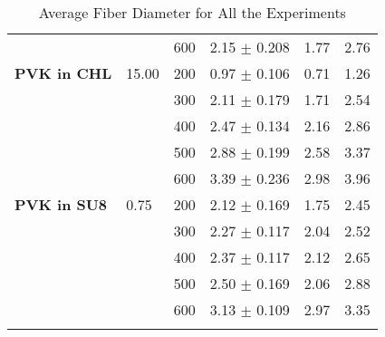{\begin{longtable}{p{} p{} p{} p{} p{} p{}}
{}                          & {}    & 600 & 2.15 $\pm$ 0.208 & 1.77 & 2.76 \\
\textbf{PVK in CHL}         & 15.00 & 200 & 0.97 $\pm$ 0.106 & 0.71 & 1.26 \\
{}                          & {}    & 300 & 2.11 $\pm$ 0.179 & 1.71 & 2.54 \\
{}                          & {}    & 400 & 2.47 $\pm$ 0.134 & 2.16 & 2.86 \\
{}                          & {}    & 500 & 2.88 $\pm$ 0.199 & 2.58 & 3.37 \\
{}                          & {}    & 600 & 3.39 $\pm$ 0.236 & 2.98 & 3.96 \\
\textbf{PVK in SU8}         & 0.75  & 200 & 2.12 $\pm$ 0.169 & 1.75 & 2.45 \\
{}                          & {}    & 300 & 2.27 $\pm$ 0.117 & 2.04 & 2.52 \\
{}                          & {}    & 400 & 2.37 $\pm$ 0.117 & 2.12 & 2.65 \\
{}                          & {}    & 500 & 2.50 $\pm$ 0.169 & 2.06 & 2.88 \\
{}                          & {}    & 600 & 3.13 $\pm$ 0.109 & 2.97 & 3.35 \\
\hline
\caption[Average Fiber Diameter for All the Experiments]{Average Fiber Diameter for All the Experiments}
\label{tab:PEOinSU8}
\end{longtable}
}
